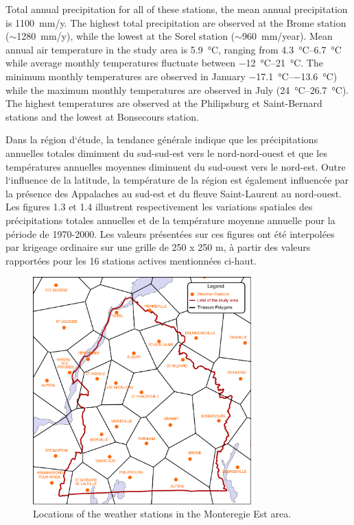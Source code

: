 \documentclass[TechnicalNoteMeteo.tex]{subfiles}
\begin{document}
Total annual precipitation for all of these stations, the mean annual precipitation is \SI{1100}{mm/y}. The highest total precipitation are observed at the Brome station ($\sim$\SI{1280}{mm/y}), while the lowest at the Sorel station ($\sim$\SI{960}{mm/year}). Mean annual air temperature in the study area is \SI{5.9}{\celsius}, ranging from \SIrange{4.3}{6.7}{\celsius} while average monthly temperatures fluctuate between \SIrange{-12}{21}{\celsius}. The minimum monthly temperatures are observed in January \SIrange{-17.1}{-13.6}{\celsius}) while the maximum monthly temperatures are observed in July (\SIrange{24}{26.7}{\celsius}).
The highest temperatures are observed at the Philipsburg et Saint-Bernard stations and the lowest at Bonsecours station.

Dans la région d‘étude, la tendance générale indique que les précipitations annuelles totales diminuent du sud-sud-est vers le nord-nord-ouest et que les températures annuelles moyennes diminuent du sud-ouest vers le nord-est. Outre l‘influence de la latitude, la température de la région est également influencée par la présence des Appalaches au sud-est et du fleuve Saint-Laurent au nord-ouest. Les figures 1.3 et 1.4 illustrent respectivement les variations spatiales des précipitations totales annuelles et de la température moyenne annuelle pour la période de 1970-2000. Les valeurs présentées sur ces figures ont été interpolées par krigeage ordinaire sur une grille de 250 x 250 m, à partir des valeurs rapportées pour les 16 stations actives mentionnées ci-haut.

\begin{figure}
\centering
\includegraphics[width=0.75\textwidth]{img/Thiessen_meteo}
\caption[Locations of the weather stations in the Monteregie Est area.]{Locations of the weather stations in the Monteregie Est area.}
\label{fig:Thiessen_meteo}
\end{figure}
\end{document}
